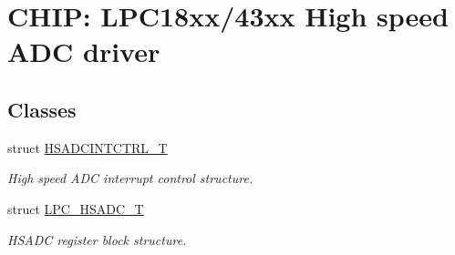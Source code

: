 \hypertarget{group___h_s_a_d_c__18_x_x__43_x_x}{}\section{C\+H\+IP\+: L\+P\+C18xx/43xx High speed A\+DC driver}
\label{group___h_s_a_d_c__18_x_x__43_x_x}
\subsection*{Classes}
\begin{DoxyCompactItemize}
\item 
struct \hyperlink{struct_h_s_a_d_c_i_n_t_c_t_r_l___t}{H\+S\+A\+D\+C\+I\+N\+T\+C\+T\+R\+L\+\_\+T}
\begin{DoxyCompactList}\small\item\em High speed A\+DC interrupt control structure. \end{DoxyCompactList}\item 
struct \hyperlink{struct_l_p_c___h_s_a_d_c___t}{L\+P\+C\+\_\+\+H\+S\+A\+D\+C\+\_\+T}
\begin{DoxyCompactList}\small\item\em H\+S\+A\+DC register block structure. \end{DoxyCompactList}\end{DoxyCompactItemize}
